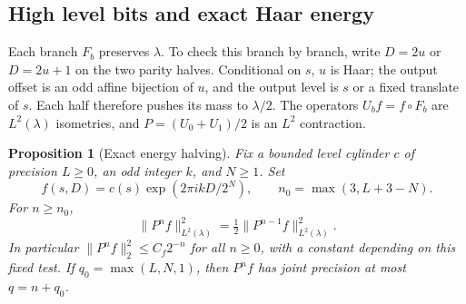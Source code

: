 \documentclass[11pt]{amsart}
\newtheorem{proposition}[theorem]{Proposition}
\theoremstyle{definition}
\theoremstyle{remark}
\begin{document}
\subsection{High level bits and exact Haar energy}
\label{st:energy-subsection}

Each branch $F_b$ preserves $\lambda$.  To check this branch by branch,
write $D=2u$ or $D=2u+1$ on the two parity halves.  Conditional on $s$,
$u$ is Haar; the output offset is an odd affine bijection of $u$, and the
output level is $s$ or a fixed translate of $s$.  Each half therefore
pushes its mass to $\lambda/2$.  The operators $U_bf=f\circ F_b$ are
$L^2(\lambda)$ isometries, and $P=(U_0+U_1)/2$ is an $L^2$ contraction.

\begin{proposition}[Exact energy halving]\label{st:energy}
Fix a bounded level cylinder $c$ of precision $L\ge0$, an odd integer
$k$, and $N\ge1$.  Set
\[
 f(s,D)=c(s)\exp(2\pi i kD/2^N),\qquad
 n_0=\max(3,L+3-N).
\]
For $n\ge n_0$,
\begin{equation}
 \|P^nf\|_{L^2(\lambda)}^2
       =\tfrac12\|P^{n-1}f\|_{L^2(\lambda)}^2.
 \label{st:energy-halving}
\end{equation}
In particular $\|P^nf\|_2^2\le C_f2^{-n}$ for all $n\ge0$, with a
constant depending on this fixed test.  If
$q_0=\max(L,N,1)$, then $P^nf$ has joint precision at most $q=n+q_0$.
\end{proposition}
\end{document}
